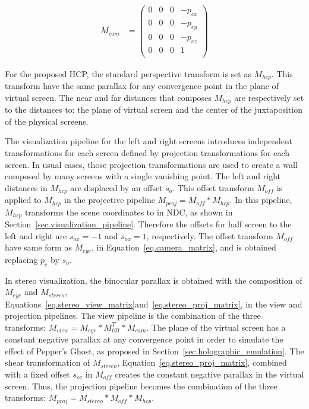 \begin{equation}
\begin{aligned}
M_{cam} &= 
\begin{pmatrix} 
0      & 0      & 0      & -p_{ex}\\
0      & 0      & 0      & -p_{ey}\\
0      & 0      & 0      & -p_{ez}\\
0      & 0      & 0      & 1\\
\end{pmatrix}
\end{aligned}
\label{eq.camera_matrix}
\end{equation}

For the proposed HCP, the standard perspective transform is set as $M_{hcp}$. This transform have the same parallax for any convergence point in the plane of virtual screen. The near and far distances that composes $M_{hcp}$ are respectively set to the distances to: the plane of virtual screen and the center of the juxtaposition of the physical screens. 

The visualization pipeline for the left and right screens introduces independent transformations for each screen defined by projection transformations for each screen. In usual cases, those projection transformations are used to create a wall composed by many screens with a single vanishing point. The left and right distances in $M_{hcp}$ are displaced by an offset $s_o$. This offset transform $M_{off}$ is applied to $M_{hcp}$ in the projective pipeline $M_{proj} = M_{off} * M_{hcp}$. In this pipeline,  $M_{hcp}$ transforms the scene coordinates to in NDC, as shown in Section~\ref{sec.visualization_pipeline}. Therefore the offsets for half screen to the left and right are $s_{ox} = -1$ and $s_{ox} = 1$, respectively. The offset transform $M_{off}$ have same form as $M_{eye}$, in Equation~\ref{eq.camera_matrix}, and is obtained replacing $p_e$ by $s_o$.

In stereo visualization, the binocular parallax is obtained with the composition of $M_{eye}$ and $M_{stereo}$, Equations~\ref{eq.stereo_view_matrix}and~\ref{eq.stereo_proj_matrix}, in the view and projection pipelines. The view pipeline is the combination of the three transforms: $M_{view} = M_{eye} * M_{tilt}^{T} * M_{cam}$. The plane of the virtual screen has a constant negative parallax at any convergence point in order to simulate the effect of Pepper's Ghost, as proposed in Section~\ref{sec.holographic_emulation}.  The shear transformation of $M_{stereo}$, Equation~\ref{eq.stereo_proj_matrix}, combined with a fixed offset $s_{oz}$ in $M_{off}$ creates the constant negative parallax in the virtual screen. Thus, the projection pipeline becomes the combination of the three transforms: $M_{proj} = M_{stereo} * M_{off} * M_{hcp}$. 

